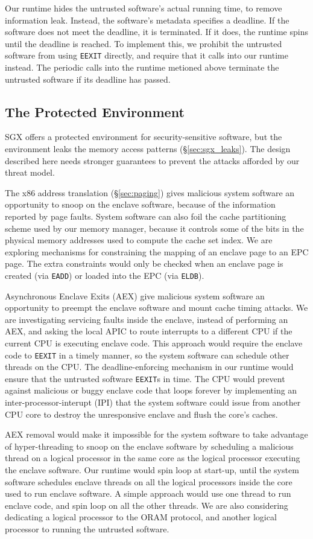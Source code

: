 Our runtime hides the untrusted software's actual running time, to remove
information leak. Instead, the software's metadata specifies a deadline.
If the software does not meet the deadline, it is terminated. If it does, the
runtime spins until the deadline is reached. To implement this, we prohibit the
untrusted software from using \texttt{EEXIT} directly, and require that it
calls into our runtime instead. The periodic calls into the runtime metioned
above terminate the untrusted software if its deadline has passed.


\subsection{The Protected Environment}

SGX offers a protected environment for security-sensitive software, but the
environment leaks the memory access patterns (\S \ref{sec:sgx_leaks}). The
design described here needs stronger guarantees to prevent the attacks afforded
by our threat model.

The x86 address translation (\S \ref{sec:paging}) gives malicious system
software an opportunity to snoop on the enclave software, because of the
information reported by page faults. System software can also foil the cache
partitioning scheme used by our memory manager, because it controls some of the
bits in the physical memory addresses used to compute the cache set index. We
are exploring mechanisms for constraining the mapping of an enclave page to an
EPC page. The extra constraints would only be checked when an enclave page is
created (via \texttt{EADD}) or loaded into the EPC (via \texttt{ELDB}).

Asynchronous Enclave Exits (AEX) give malicious system software an opportunity
to preempt the enclave software and mount cache timing attacks. We are
investigating servicing faults inside the enclave, instead of performing an
AEX, and asking the local APIC to route interrupts to a different CPU if the
current CPU is executing enclave code. This approach would require the enclave
code to \texttt{EEXIT} in a timely manner, so the system software can schedule
other threads on the CPU. The deadline-enforcing mechanism in our runtime would
ensure that the untrusted software \texttt{EEXIT}s in time. The CPU would
prevent against malicious or buggy enclave code that loops forever by
implementing an inter-processor-interupt (IPI) that the system software could
issue from another CPU core to destroy the unresponsive enclave and flush the
core's caches.

AEX removal would make it impossible for the system software to take advantage
of hyper-threading to snoop on the enclave software by scheduling a malicious
thread on a logical processor in the same core as the logical processor
executing the enclave software. Our runtime would spin loop at start-up, until
the system software schedules enclave threads on all the logical processors
inside the core used to run enclave software. A simple approach would use one
thread to run enclave code, and spin loop on all the other threads. We are
also considering dedicating a logical processor to the ORAM protocol, and
another logical processor to running the untrusted software.
